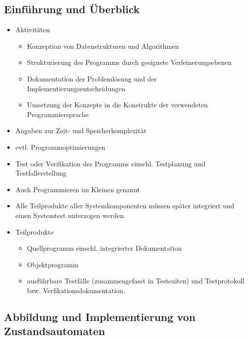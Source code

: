 \subsection{Einführung und Überblick}
\begin{itemize}
    \item Aktivitäten
    \begin{itemize}
        \item Konzeption von Datenstrukturen und Algorithmen
        \item Strukturierung des Programms durch geeignete Verfeinerungsebenen
        \item Dokumentation der Problemlösung und der Implementierungsentscheidungen
        \item Umsetzung der Konzepte in die Konstrukte der verwendeten Programmiersprache
    \end{itemize}
    \item Angaben zur Zeit- und Speicherkomplexität
    \item evtl. Programmoptimierungen
    \item Test oder Verifikation des Programms einschl. Testplanung und Testfallerstellung
    \item Auch Programmieren im Kleinen genannt
    \item Alle Teilprodukte aller Systemkomponenten müssen später integriert und einen Systemtest unterzogen werden.
    \item Teilprodukte
    \begin{itemize}
        \item Quellprogramm einschl. integrierter Dokumentation
        \item Objektprogramm
        \item ausführbare Testfälle (zusammengefasst in Testsuiten) und Testprotokoll bzw. Verfikationsdokumentation.
    \end{itemize}
\end{itemize}

\subsection{Abbildung und Implementierung von Zustandsautomaten}
